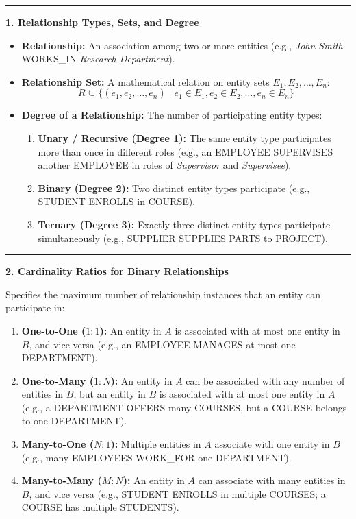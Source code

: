\documentclass[11pt,a4paper]{article}
\newcommand{\ic}[1]{\mbox{\colorbox{AnthCodeBG}{\footnotesize\ttfamily\textcolor{AnthBlue}{#1}}}}
\newcommand{\concept}[1]{%
  \vspace{3pt}\noindent\textcolor{AnthGreen}{\rule{3.5pt}{10pt}}\enspace
  \textbf{\sffamily\color{AnthDark}#1}\par\vspace{2pt}%
}
\begin{document}
\concept{1. Relationship Types, Sets, and Degree}
\begin{itemize}
  \item \textbf{Relationship:} An association among two or more entities (e.g., \emph{John Smith} \ic{WORKS\_IN} \emph{Research Department}).
  \item \textbf{Relationship Set:} A mathematical relation on entity sets $E_1, E_2, \dots, E_n$:
    \begin{equation}
      R \subseteq \{ (e_1, e_2, \dots, e_n) \mid e_1 \in E_1, e_2 \in E_2, \dots, e_n \in E_n \}
    \end{equation}
  \item \textbf{Degree of a Relationship:} The number of participating entity types:
    \begin{enumerate}
      \item \textbf{Unary / Recursive (Degree 1):} The same entity type participates more than once in different roles (e.g., an \ic{EMPLOYEE} \ic{SUPERVISES} another \ic{EMPLOYEE} in roles of \emph{Supervisor} and \emph{Supervisee}).
      \item \textbf{Binary (Degree 2):} Two distinct entity types participate (e.g., \ic{STUDENT} \ic{ENROLLS} in \ic{COURSE}).
      \item \textbf{Ternary (Degree 3):} Exactly three distinct entity types participate simultaneously (e.g., \ic{SUPPLIER} \ic{SUPPLIES} \ic{PARTS} to \ic{PROJECT}).
    \end{enumerate}
\end{itemize}

\concept{2. Cardinality Ratios for Binary Relationships}
Specifies the maximum number of relationship instances that an entity can participate in:
\begin{enumerate}
  \item \textbf{One-to-One ($1:1$):} An entity in $A$ is associated with at most one entity in $B$, and vice versa (e.g., an \ic{EMPLOYEE} \ic{MANAGES} at most one \ic{DEPARTMENT}).
  \item \textbf{One-to-Many ($1:N$):} An entity in $A$ can be associated with any number of entities in $B$, but an entity in $B$ is associated with at most one entity in $A$ (e.g., a \ic{DEPARTMENT} \ic{OFFERS} many \ic{COURSES}, but a \ic{COURSE} belongs to one \ic{DEPARTMENT}).
  \item \textbf{Many-to-One ($N:1$):} Multiple entities in $A$ associate with one entity in $B$ (e.g., many \ic{EMPLOYEES} \ic{WORK\_FOR} one \ic{DEPARTMENT}).
  \item \textbf{Many-to-Many ($M:N$):} An entity in $A$ can associate with many entities in $B$, and vice versa (e.g., \ic{STUDENT} \ic{ENROLLS} in multiple \ic{COURSES}; a \ic{COURSE} has multiple \ic{STUDENTS}).
\end{enumerate}
\end{document}

